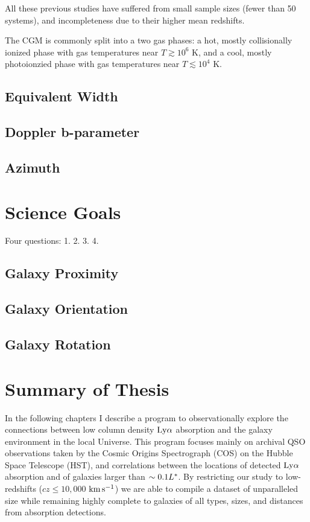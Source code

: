 \documentclass[twocolumn,tighten]{aastex62}
\newcommand{\kms}{$\rm km\, s^{-1}$}
\begin{document}
All these previous studies have suffered from small sample sizes (fewer than 50 systems), and incompleteness due to their higher mean redshifts. 




The CGM is commonly split into a two gas phases: a hot, mostly collisionally ionized phase with gas temperatures near $T\gtrsim 10^6$ K, and a cool, mostly photoionzied phase with gas temperatures near $T \lesssim 10^4$ K.



\subsection{Equivalent Width}

\subsection{Doppler b-parameter}



\subsection{Azimuth}


\section{Science Goals}
Four questions:
1.
2.
3.
4.

\subsection{Galaxy Proximity}


\subsection{Galaxy Orientation}


\subsection{Galaxy Rotation}



\section{Summary of Thesis}
In the following chapters I describe a program to observationally explore the connections between low column density $\rm Ly\alpha$ absorption and the galaxy environment in the local Universe. This program focuses mainly on archival QSO observations taken by the Cosmic Origins Spectrograph (COS) on the Hubble Space Telescope (HST), and correlations between the locations of detected $\rm Ly\alpha$ absorption and of galaxies larger than $\sim 0.1 L^{\**}$. By restricting our study to low-redshifts ($cz \leq 10,000$ \kms) we are able to compile a dataset of unparalleled size while remaining highly complete to galaxies of all types, sizes, and distances from absorption detections. 
\end{document}
